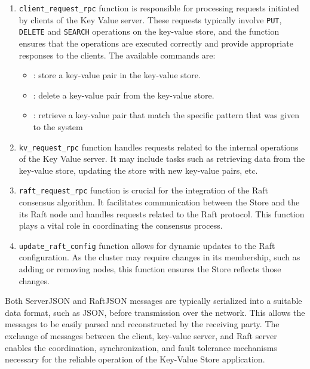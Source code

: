 \documentclass{article}
\begin{document}
\begin{enumerate}
	\item \texttt{client\_request\_rpc} function is responsible for processing requests initiated by clients of the Key Value server. These requests typically involve \texttt{PUT}, \texttt{DELETE} and \texttt{SEARCH} operations on the key-value store, and the function ensures that the operations are executed correctly and provide appropriate responses to the clients. The available commands are:
		\begin{itemize}
    		\item {}: store a key-value pair in the key-value store.
    		\item {}: delete a key-value pair from the key-value store.
    		\item {}: retrieve a key-value pair that match the specific pattern 
    		that was given to the system
		\end{itemize}
	\item \texttt{kv\_request\_rpc} function handles requests related to the internal operations of the Key Value server. It may include tasks such as retrieving data from the key-value store, updating the store with new key-value pairs, etc.

	\item \texttt{raft\_request\_rpc} function is crucial for the integration of the Raft consensus algorithm. It facilitates communication between the Store and the its Raft node and handles requests related to the Raft protocol. This function plays a vital role in coordinating the consensus process.
		
	\item \texttt{update\_raft\_config} function allows for dynamic updates to the Raft configuration. As the cluster may require changes in its membership, such as adding or removing nodes, this function ensures the Store reflects those changes.

\end{enumerate}

Both ServerJSON and RaftJSON messages are typically serialized into a suitable data format,
such as JSON, before transmission over the network. This allows the messages to be easily
parsed and reconstructed by the receiving party. The exchange of messages between the client,
key-value server, and Raft server enables the coordination, synchronization, and fault tolerance
mechanisms necessary for the reliable operation of the Key-Value Store application.
\end{document}
